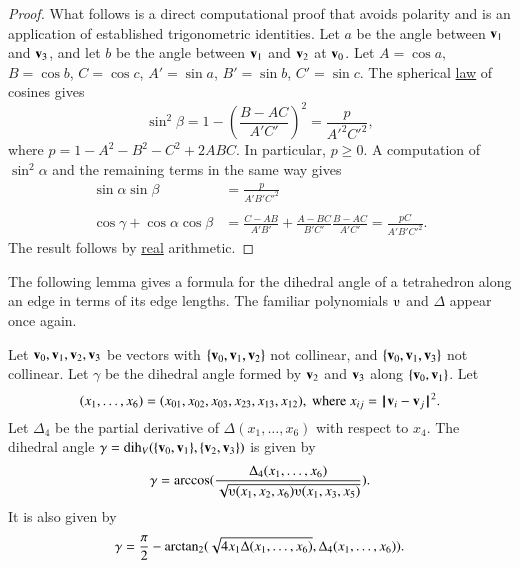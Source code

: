 \begin{proof}  
  What follows is a direct computational proof that avoids polarity and
is an
  application of established trigonometric identities.  Let $a$ be the
  angle between ${\mathbf v}_1$ and ${\mathbf v}_3$, and let $b$ be the angle between ${\mathbf v}_1$
  and ${\mathbf v}_2$ at ${\mathbf v}_0$.  Let $A=\cos a$, $B=\cos b$, $C=\cos c$,
  $A'=\sin a$, $B'=\sin b$, $C'=\sin c$.  The spherical
  \hyperref[lemma:sloc]{law} of cosines gives
\begin{displaymath}\sin^2\beta = 1-\left(\frac{B-A C}{A' C'}\right)^2
  = \frac{p}{A'^2 C'^2},\end{displaymath}
where $p=1-A^2 - B^2 - C^2 + 2 A B C$.
In particular, $p\ge 0$.
%
A computation of $\sin^2\alpha$ and the remaining terms in the same way gives
\begin{align*}
  \sin\alpha\sin\beta &= \frac{\displaystyle p}{\displaystyle A' B' C'^2}\\ 
  \\
  \cos\gamma + \cos\alpha \cos\beta &=
  \frac{\displaystyle C - A B}{\displaystyle A' B'} + 
\frac{\displaystyle A - B C}{\displaystyle B' C'} 
\frac{\displaystyle B - A C}{\displaystyle A' C'}
  = \frac{\displaystyle p C}{\displaystyle A' B' C'^2}.
\end{align*}
The result follows by \hyperref[back:analysis]{real} arithmetic.
\end{proof}

The following lemma gives a formula for the dihedral angle
of a tetrahedron along an edge in terms of its edge lengths.  The
familiar polynomials $\ups$ and $\Delta$ appear once again.
%
%


\begin{lemma}[]\label{lemma:dihform}
Let ${\mathbf v}_0,{\mathbf v}_1,{\mathbf v}_2,{\mathbf v}_3$ 
be vectors with $\{{\mathbf v}_0,{\mathbf v}_1,{\mathbf v}_2\}$ not collinear, 
and $\{{\mathbf v}_0,{\mathbf v}_1,{\mathbf v}_3\}$ not
collinear. 
Let $\gamma$ be the dihedral angle formed
by ${\mathbf v}_2$ and ${\mathbf v}_3$ along $\{{\mathbf v}_0,{\mathbf v}_1\}$. Let
\begin{displaymath}(x_1,\ldots,x_6) = 
(x_{01},x_{02},x_{03},x_{23},x_{13},x_{12}),
\text{ where } x_{ij}=\norm{\v_i}{\v_j}^2.\end{displaymath}
Let $\Delta_4$ be the partial derivative of $\Delta(x_1,\ldots,x_6)$ with
respect to $x_4$.
The dihedral angle $\gamma=\operatorname{dih}_V(\{{\mathbf v}_0,{\mathbf v}_1\},\{{\mathbf v}_2,{\mathbf v}_3\})$
is given by
\begin{displaymath}
\gamma=\arccos(\frac{\Delta_4(x_1,\ldots,x_6)}{\sqrt{
\ups(x_1,x_2,x_6)\ups(x_1,x_3,x_5)}}).
\end{displaymath}
It is also given by
\begin{displaymath}
\gamma=\frac{\pi}{2} - {\operatorname{arctan_2}}
({\sqrt{4 x_1 \Delta(x_1,\ldots,x_6)}},{\Delta_4(x_1,\ldots,x_6)}).
\end{displaymath}
\end{lemma}
%


